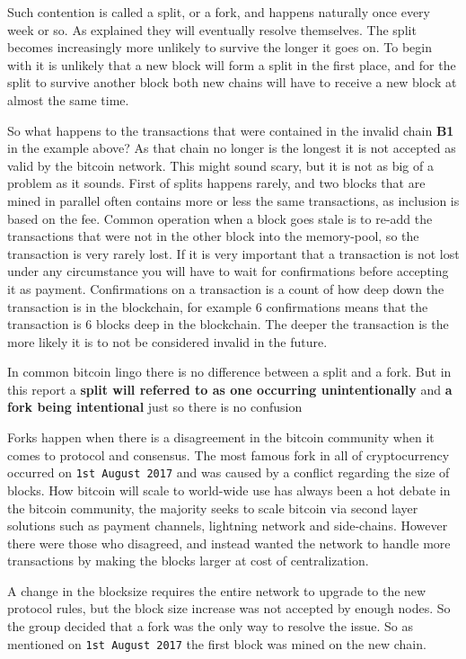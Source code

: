Such contention is called a split, or a fork, and happens naturally once every week or so. As explained they will eventually resolve themselves. The split becomes increasingly more unlikely to survive the longer it goes on. To begin with it is unlikely that a new block will form a split in the first place, and for the split to survive another block both new chains will have to receive a new block at almost the same time.\cite{antonopoulos_2017}

So what happens to the transactions that were contained in the invalid chain \textbf{B1} in the example above? As that chain no longer is the longest it is not accepted as valid by the bitcoin network. This might sound scary, but it is not as big of a problem as it sounds. First of splits happens rarely, and two blocks that are mined in parallel often contains more or less the same transactions, as inclusion is based on the fee. Common operation when a block goes stale is to re-add the transactions that were not in the other block into the memory-pool, so the transaction is very rarely lost. If it is very important that a transaction is not lost under any circumstance you will have to wait for confirmations before accepting it as payment. Confirmations on a transaction is a count of how deep down the transaction is in the blockchain, for example 6 confirmations means that the transaction is 6 blocks deep in the blockchain. The deeper the transaction is the more likely it is to not be considered invalid in the future.

In common bitcoin lingo there is no difference between a split and a fork. But in this report a \textbf{split will referred to as one occurring unintentionally} and \textbf{a fork being intentional} just so there is no confusion

Forks happen when there is a disagreement in the bitcoin community when it comes to protocol and consensus. The most famous fork in all of cryptocurrency occurred on \texttt{1st August 2017} and was caused by a conflict regarding the size of blocks. How bitcoin will scale to world-wide use has always been a hot debate in the bitcoin community, the majority seeks to scale bitcoin via second layer solutions such as payment channels, lightning network and side-chains. However there were those who disagreed, and instead wanted the network to handle more transactions by making the blocks larger at cost of centralization. 

A change in the blocksize requires the entire network to upgrade to the new protocol rules, but the block size increase was not accepted by enough nodes. So the group decided that a fork was the only way to resolve the issue. So as mentioned on \texttt{1st August 2017} the first block was mined on the new chain.\cite{selena_2017}

